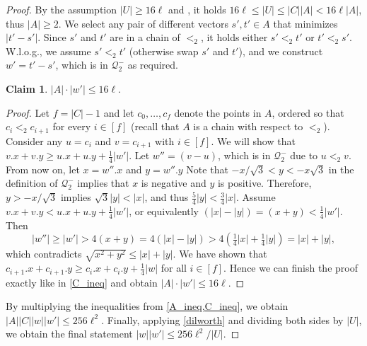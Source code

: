 \documentclass[11pt, letterpaper]{article}
\theoremstyle{plain}
\theoremstyle{definition}
\newtheorem{claim}{Claim}
\theoremstyle{remark}
\newcommand{\Q}{\mathcal{Q}}
\newcommand{\absolute}[1]{\lvert#1\rvert}
\begin{document}
\begin{proof}
By the assumption $|U| \ge 16\ell$ and , it holds
$16 \ell \le |U| \le |C| |A| < 16\ell|A|$,
thus $|A| \ge 2$.
We select any pair of different vectors $s', t' \in A$ that minimizes $|t' - s'|$. Since $s'$ and $t'$ are in a chain of $<_2$, it holds either $s' <_2 t'$ or $t' <_2 s'$. W.l.o.g., we assume $s' <_2 t'$ (otherwise swap $s'$ and $t'$), and we construct $w' = t' - s'$, which is in $\Q_2^-$ as required.

\begin{claim}\label{A_ineq}
	$\absolute{A}\cdot \absolute{w'} \leq 16\ell$. 
	\begin{proof}
	
		Let $f = |C| - 1$ and
		let $c_0, \dots, c_{f}$ denote the points in $A$, ordered so that $c_i <_2 c_{i + 1}$ for every $i \in [f]$ (recall that $A$ is a chain with respect to $<_2$).
		Consider any $u = c_i$ and $v = c_{i + 1}$ with $i \in [f]$. We will show that $v.x + v.y \geq u.x + u.y + \frac14\absolute{w'}$. 		
		Let $w'' = (v - u)$, which is in $\Q_2^-$ due to $u <_2 v$. From now on, let $x = w''.x$ and $y = w''.y$
		Note that $-x/\sqrt{3} < y < -x \sqrt{3}$ in the definition of $\Q_2^-$ implies that $x$ is negative and $y$ is positive.
		Therefore, $y > -x/\sqrt{3}$ implies $\sqrt{3}\absolute{y} < \absolute{x}$, and thus $\frac 5 4\absolute{y} < \frac 3 4\absolute{x}$.
		Assume $v.x + v.y < u.x + u.y + \frac14\absolute{w'}$, or equivalently $(\absolute{x} - \absolute{y}) = (x + y) < \frac14\absolute{w'}$. Then $$\absolute{w''} \geq \absolute{w'} > 4(x + y) = 4(\absolute{x} - \absolute{y}) > 4(\tfrac14\absolute{x} + \tfrac14\absolute{y}) = 
		\absolute{x} + \absolute{y},$$
		which contradicts $\sqrt{x^2 + y^2} \leq \absolute{x} + \absolute{y}$. We have shown that $c_{i + 1}.x + c_{i + 1}.y \geq c_i.x + c_i.y + \frac14\absolute{w}$ for all $i \in [f]$. Hence we can finish the proof exactly like in \cref{C_ineq} and obtain $\absolute{A}\cdot \absolute{w'} \leq 16\ell$.
	\end{proof}
\end{claim}

By multiplying the inequalities from \cref{A_ineq,C_ineq}, we obtain $\absolute{A}\absolute{C}\absolute{w}\absolute{w'} \leq 256\ell^2$. Finally, applying \cref{dilworth} and dividing both sides by $\absolute{U}$, we obtain the final statement $\absolute{w}\absolute{w'} \leq 256\ell^2/\absolute{U}$.


\end{proof}
\end{document}
